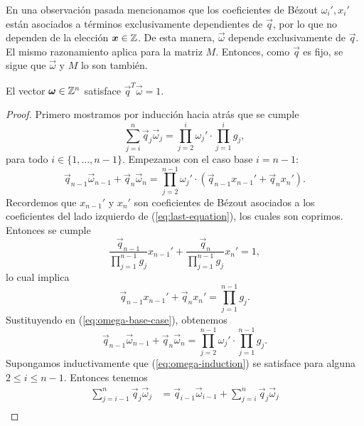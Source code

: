 En una observación pasada mencionamos que los coeficientes de Bézout $\omega_i', x_i'$ están
asociados a términos exclusivamente dependientes de $\vec{q}$, por lo que no dependen de la elección
$\boldsymbol{x} \in \mathbb{Z}$. De esta manera, $\vec{\omega}$ depende exclusivamente de $\vec{q}$. El mismo
razonamiento aplica para la matriz $M$. Entonces, como $\vec{q}$ es fijo, se sigue que
$\vec{\omega}$ y $M$ lo son también.

\begin{lemma} \label{lemma:iso1} El vector $\boldsymbol{\omega} \in \mathbb{Z}^n$ satisface $\vec{q}^T\vec{\omega}
	= 1$. \end{lemma} \begin{proof} Primero mostramos por inducción hacia atrás que se cumple
	\begin{equation} \label{eq:omega-induction} \sum_{j=i}^{n}\vec{q}_j\vec{\omega}_j =
		\prod_{j=2}^{i}\omega_j' \cdot \prod_{j=1}^{i}g_j, \end{equation} para todo $i \in \lbrace
		1, \ldots, n - 1\rbrace$. Empezamos con el caso base $i = n - 1$: \begin{equation}
			\label{eq:omega-base-case} \vec{q}_{n-1}\vec{\omega}_{n-1} + \vec{q}_n\vec{\omega}_n =
			\prod_{j=2}^{n-1}\omega_j' \cdot \left(\vec{q}_{n-1}x_{n-1}' + \vec{q}_nx_n'\right).
		\end{equation} Recordemos que $x_{n-1}'$ y $x_n'$ son coeficientes de Bézout asociados a los
		coeficientes del lado izquierdo de (\ref{eq:last-equation}), los cuales son coprimos.
		Entonces se cumple
	\begin{equation*}
		\frac{\vec{q}_{n-1}}{\prod_{j=1}^{n-1}g_j}x_{n-1}' +
		\frac{\vec{q}_n}{\prod_{j=1}^{n-1}g_j}x_n' = 1,
	\end{equation*}
	lo cual implica 
	\begin{equation*}
		\vec{q}_{n-1}x_{n-1}' + \vec{q}_nx_n' = \prod_{j=1}^{n-1}g_j.
	\end{equation*}
	Sustituyendo en (\ref{eq:omega-base-case}), obtenemos
	\begin{equation*}
		\vec{q}_{n-1}\vec{\omega}_{n-1} + \vec{q}_n\vec{\omega}_n  =
		\prod_{j=2}^{n-1}\omega_j' \cdot \prod_{j=1}^{n-1}g_j.
	\end{equation*}
	Supongamos inductivamente que (\ref{eq:omega-induction}) se satisface para alguna $2 \leq i \leq
	n - 1$. Entonces tenemos
	\begin{align*}
		\sum_{j=i-1}^{n}\vec{q}_j\vec{\omega}_j
		&= \vec{q}_{i-1}\vec{\omega}_{i-1} + \sum_{j=i}^{n}\vec{q}_j\vec{\omega}_j \\

\end{align*}
\end{proof}
